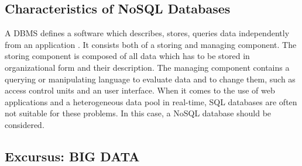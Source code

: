 \subsection{Characteristics of NoSQL Databases}

A \ac{DBMS} defines a software which describes, stores, queries data independently from an application \cite[p.2 ff.]{nosql_meier}. It consists both of a storing and managing component. The storing component is composed of all data which has to be stored in organizational form and their description. The managing component contains a querying or manipulating language to evaluate data and to change them, such as access control units and an user interface. When it comes to the use of web applications and a heterogeneous data pool in real-time, SQL databases are often not suitable for these problems. In this case, a NoSQL database should be considered. 

\subsection{Excursus: BIG DATA} \label{bigdata}

